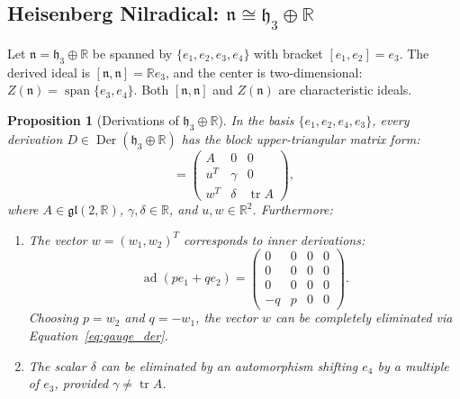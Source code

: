 \documentclass[11pt,a4paper]{article}
\newtheorem{proposition}[theorem]{Proposition}
\theoremstyle{definition}
\theoremstyle{remark}
\newcommand{\R}{\mathbb{R}}
\newcommand{\n}{\mathfrak{n}}
\newcommand{\hh}{\mathfrak{h}}
\newcommand{\ad}{\operatorname{ad}}
\newcommand{\Der}{\operatorname{Der}}
\newcommand{\tr}{\operatorname{tr}}
\newcommand{\spanop}{\operatorname{span}}
\begin{document}
\subsection{Heisenberg Nilradical: $\n \cong \hh_3 \oplus \R$}\label{subsec:H3R}
Let $\n = \hh_3 \oplus \R$ be spanned by $\{e_1, e_2, e_3, e_4\}$ with bracket $[e_1, e_2] = e_3$. The derived ideal is $[\n, \n] = \R e_3$, and the center is two-dimensional: $Z(\n) = \spanop\{e_3, e_4\}$. Both $[\n, \n]$ and $Z(\n)$ are characteristic ideals.

\begin{proposition}[Derivations of $\hh_3 \oplus \R$]\label{prop:der_h3r}
In the basis $\{e_1, e_2, e_4, e_3\}$, every derivation $D \in \Der(\hh_3 \oplus \R)$ has the block upper-triangular matrix form:
\begin{equation}
    [D] = \begin{pmatrix} A & 0 & 0 \\ u^T & \gamma & 0 \\ w^T & \delta & \tr A \end{pmatrix},
\end{equation}
where $A \in \mathfrak{gl}(2, \R)$, $\gamma, \delta \in \R$, and $u, w \in \R^2$. Furthermore:
\begin{enumerate}
    \item The vector $w = (w_1, w_2)^T$ corresponds to inner derivations:
    \begin{equation}
        \ad(p e_1 + q e_2) = \begin{pmatrix} 0 & 0 & 0 & 0 \\ 0 & 0 & 0 & 0 \\ 0 & 0 & 0 & 0 \\ -q & p & 0 & 0 \end{pmatrix}.
    \end{equation}
    Choosing $p = w_2$ and $q = -w_1$, the vector $w$ can be completely eliminated via Equation~\eqref{eq:gauge_der}.
    \item The scalar $\delta$ can be eliminated by an automorphism shifting $e_4$ by a multiple of $e_3$, provided $\gamma \neq \tr A$.
\end{enumerate}
\end{proposition}
\end{document}
